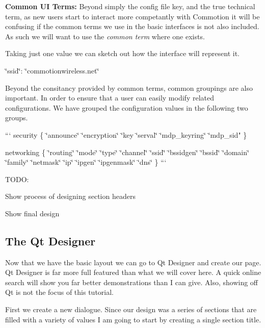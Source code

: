 {\bfseries Common U\+I Terms\+:} Beyond simply the config file key, and the true technical term, as new users start to interact more competantly with Commotion it will be confusing if the common terms we use in the basic interfaces is not also included. As such we will want to use the {\itshape common term} where one exists.

Taking just one value we can sketch out how the interface will represent it.

{\ttfamily \char`\"{}ssid\char`\"{}\+: \char`\"{}commotionwireless.\+net\char`\"{}}



Beyond the consitancy provided by common terms, common groupings are also important. In order to ensure that a user can easily modify related configurations. We have grouped the configuration values in the following two groups.

``` security \{ \char`\"{}announce\char`\"{} \char`\"{}encryption\char`\"{} \char`\"{}key
  \char`\"{}serval\char`\"{}
  \char`\"{}mdp\+\_\+keyring\char`\"{}
  \char`\"{}mdp\+\_\+sid" \}

networking \{ \char`\"{}routing\char`\"{} \char`\"{}mode\char`\"{} \char`\"{}type\char`\"{} \char`\"{}channel\char`\"{} \char`\"{}ssid\char`\"{} \char`\"{}bssidgen\char`\"{} \char`\"{}bssid\char`\"{} \char`\"{}domain\char`\"{} \char`\"{}family\char`\"{} \char`\"{}netmask\char`\"{} \char`\"{}ip\char`\"{} \char`\"{}ipgen\char`\"{} \char`\"{}ipgenmask\char`\"{} \char`\"{}dns\char`\"{} \} ```

T\+O\+D\+O\+:
\begin{DoxyItemize}
\item Show process of designing section headers
\item Show final design
\end{DoxyItemize}

\subsection*{The Qt Designer}

Now that we have the basic layout we can go to Qt Designer and create our page. Qt Designer is far more full featured than what we will cover here. A quick online search will show you far better demonstrations than I can give. Also, showing off Qt is not the focus of this tutorial.

First we create a new dialogue. Since our design was a series of sections that are filled with a variety of values I am going to start by creating a single section title.

